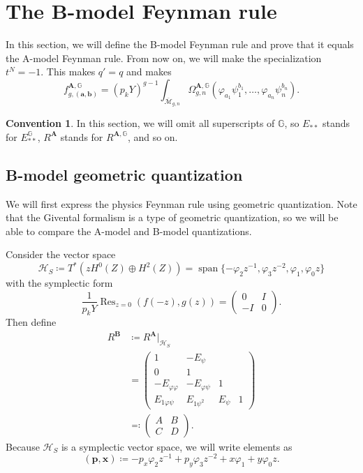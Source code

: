 \documentclass[10pt]{amsart}
\theoremstyle{definition}
\newtheorem{conv}[thm]{Convention}
\theoremstyle{remark}
\theoremstyle{plain}
\theoremstyle{definition}
\theoremstyle{remark}
\newcommand{\G}{\mathbb{G}}
\newcommand{\ba}{\mathbf{a}}
\newcommand{\bb}{\mathbf{b}}
\newcommand{\bA}{\mathbf{A}}
\newcommand{\bB}{\mathbf{B}}
\newcommand{\msc}[1]{\mathscr{#1}}
\newcommand{\mbf}[1]{\mathbf{#1}}
\newcommand{\on}[1]{\operatorname{#1}}
\newcommand{\ol}[1]{\overline{#1}}
\newcommand{\1}{\mathbf{1}}
\newcommand{\2}{\mathbf{2}}
\newcommand{\3}{\mathbf{3}}
\DeclareMathOperator{\Res}{Res}
\numberwithin{equation}{section}
\begin{document}
\section{The B-model Feynman rule}%
\label{sec:The B-model Feynman rule}

In this section, we will define the B-model Feynman rule and prove that it equals the A-model Feynman rule. From now on, we will make the specialization $t^N = -1$. This makes $q' = q$ and makes
\[ f_{g,(\ba,\bb)}^{\bA,\G} = (p_kY)^{g-1} \int_{\ol{\msc{M}}_{g,n}} \Omega_{g,n}^{\bA,\G}(\varphi_{a_1} \psi_1^{b_1}, \ldots, \varphi_{a_n} \psi_n^{b_n}). \]

\begin{conv}
    In this section, we will omit all superscripts of $\G$, so $E_{**}$ stands for $E_{**}^{\G}$, $R^{\bA}$ stands for $R^{\bA, \G}$, and so on.
\end{conv}

\subsection{B-model geometric quantization}%
\label{sub:B model geometric quantization}

We will first express the physics Feynman rule using geometric quantization. Note that the Givental formalism is a type of geometric quantization, so we will be able to compare the A-model and B-model quantizations.

Consider the vector space 
\[\msc{H}_S \coloneqq T^*(zH^0(Z) \oplus H^2(Z)) = \on{span}\{  -\varphi_2 z^{-1}, \varphi_3 z^{-2},\varphi_1, \varphi_0 z \} \] with the symplectic form
\[ \frac{1}{p_k Y} \Res_{z=0} (f(-z),g(z)) = \begin{pmatrix}
    0 & I \\
    -I & 0
\end{pmatrix}
. \]
Then define
\begin{align*}
    R^{\bB} &\coloneqq R^{\bA}|_{\msc{H}_S} \\
    &= \begin{pmatrix}
        1 & -E_{\psi} \\
        0 & 1 \\
        -E_{\varphi\varphi} & -E_{\varphi\psi} & 1 \\
        E_{1\varphi\psi} & E_{1\psi^2} & E_{\psi} & 1
    \end{pmatrix} \\
    &\eqqcolon \begin{pmatrix}
        A & B \\
        C & D
    \end{pmatrix}.
\end{align*}
Because $\msc{H}_S$ is a symplectic vector space, we will write elements as
\[ (\mbf{p}, \mbf{x}) \coloneqq  - p_x \varphi_2 z^{-1} +p_y \varphi_3 z^{-2} + x \varphi_1 + y \varphi_0 z. \]
\end{document}
